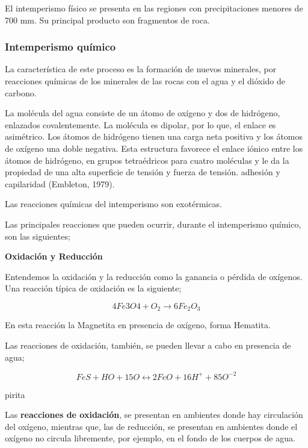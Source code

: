 El intemperismo físico se presenta en las regiones con precipitaciones menores de 700 mm. Su principal producto son fragmentos de roca.

\subsubsection{Intemperismo químico}

La característica de este proceso es la formación de nuevos minerales, por reacciones químicas de los minerales de las rocas con el agua y el dióxido de carbono.

La molécula del agua consiste de un átomo de oxígeno y dos de hidrógeno, enlazados covalentemente. La molécula es dipolar, por lo que, el enlace es asimétrico. Los átomos de hidrógeno tienen una carga neta positiva y los átomos de oxígeno una doble negativa. Esta estructura favorece el enlace iónico entre los átomos de hidrógeno, en grupos tetraédricos para cuatro moléculas y le da la propiedad de una alta superficie de tensión y fuerza de tensión. adhesión y capilaridad (Embleton, 1979).

Las reacciones químicas del intemperismo son exotérmicas.

Las principales reacciones que pueden ocurrir, durante el intemperismo químico, son las siguientes;

\textbf{Oxidación y Reducción}

Entendemos la oxidación y la reducción como la ganancia o pérdida de oxígenos. Una reacción típica de oxidación es la siguiente;

\begin{equation}
    4Fe3O4+ O_2 \longrightarrow  6Fe_2O_3
\end{equation}

En esta reacción la Magnetita en presencia de oxígeno, forma Hematita.

Las reacciones de oxidación, también, se pueden llevar a cabo en presencia de agua;

\begin{equation}
    FeS + HO + 15O \longleftrightarrow  2FeO + 16H^+ +85O^{- 2}
\end{equation}

pirita

Las \textbf{reacciones de oxidación}, se presentan en ambientes donde hay circulación del oxígeno, mientras que, las de reducción, se presentan en ambientes donde el oxígeno no circula libremente, por ejemplo, en el fondo de los cuerpos de agua.

